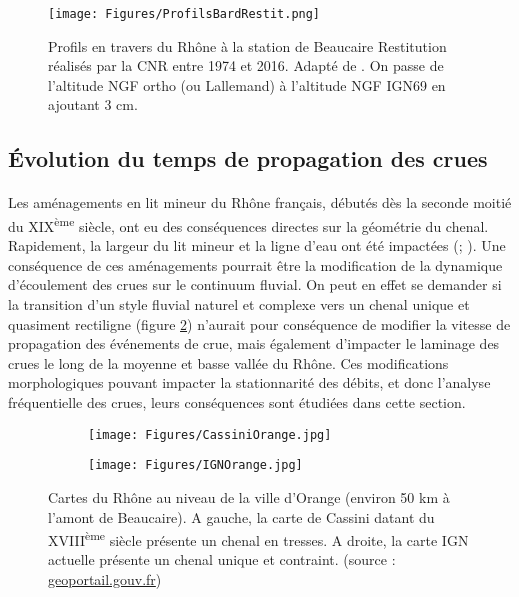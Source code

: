 \documentclass[11pt]{article}
\begin{document}
	\begin{figure}[h]
	\centering
		\texttt{[image: Figures/ProfilsBardRestit.png]}
        \caption{Profils en travers du Rhône à la station de Beaucaire Restitution réalisés par la CNR entre 1974 et 2016. Adapté de \citet{bard_actualisation_2018}. On passe de l'altitude NGF ortho (ou Lallemand) à l'altitude NGF IGN69 en ajoutant 3 cm.}	
		\label{fig:ProfilsRestit}
	\end{figure}
	
\FloatBarrier


\subsection{Évolution du temps de propagation des crues}

	\paragraph{} Les aménagements en lit mineur du Rhône français, débutés dès la seconde moitié du XIX\textsuperscript{ème} siècle, ont eu des conséquences directes sur la géométrie du chenal. Rapidement, la largeur du lit mineur et la ligne d'eau ont été impactées (\cite{gaydou_schema_2013}; \cite{piegay_observatoire_2022}). Une conséquence de ces aménagements pourrait être la modification de la dynamique d'écoulement des crues sur le continuum fluvial. On peut en effet se demander si la transition d'un style fluvial naturel et complexe vers un chenal unique et quasiment rectiligne (figure \ref{fig:CartesChenal}) n'aurait pour conséquence de modifier la vitesse de propagation des événements de crue, mais également d'impacter le laminage des crues le long de la moyenne et basse vallée du Rhône. Ces modifications morphologiques pouvant impacter la stationnarité des débits, et donc l'analyse fréquentielle des crues, leurs conséquences sont étudiées dans cette section.
	
	\begin{figure}[h]
		\centering
		\begin{subfigure}{0.4\linewidth}
			\texttt{[image: Figures/CassiniOrange.jpg]}
		\end{subfigure}
		\begin{subfigure}{0.4\linewidth}
			\texttt{[image: Figures/IGNOrange.jpg]}
		\end{subfigure}
		\caption{Cartes du Rhône au niveau de la ville d'Orange (environ 50 km à l'amont de Beaucaire). A gauche, la carte de Cassini datant du XVIII\textsuperscript{ème} siècle présente un chenal en tresses. A droite, la carte IGN actuelle présente un chenal unique et contraint. (source : \url{geoportail.gouv.fr})}
		\label{fig:CartesChenal}
	\end{figure}
	
\end{document}
